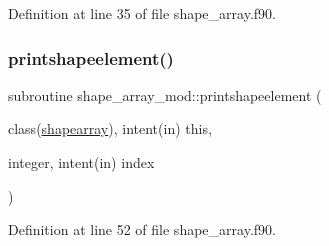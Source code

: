 Definition at line 35 of file shape\+\_\+array.\+f90.

\mbox{\label{namespaceshape__array__mod_a21045b79e1718e47bd933ce6181ee7fd}} 
\subsubsection{\texorpdfstring{printshapeelement()}{printshapeelement()}}
{\footnotesize\ttfamily subroutine shape\+\_\+array\+\_\+mod\+::printshapeelement (\begin{DoxyParamCaption}\item[{class(\hyperlink{structshape__array__mod_1_1shapearray}{shapearray}), intent(in)}]{this,  }\item[{integer, intent(in)}]{index }\end{DoxyParamCaption})\hspace{0.3cm}{\ttfamily [private]}}



Definition at line 52 of file shape\+\_\+array.\+f90.

